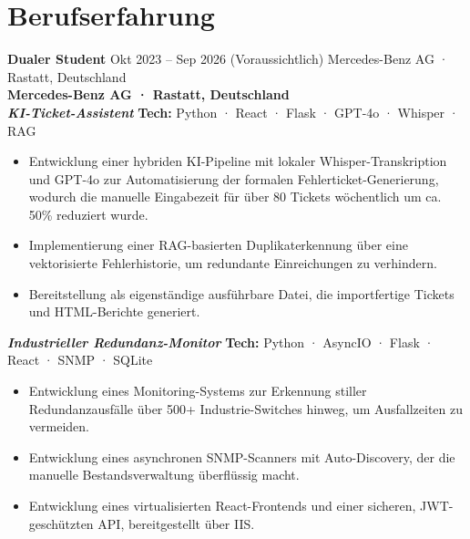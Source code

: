 \documentclass[10pt, a4paper]{article}
\newcommand{\entry}[3]{%
  \textbf{\large #1} \hfill \textcolor{subtle}{\small #2}%
  \def\temp{#3}\ifx\temp\empty\else\\[0.1em]\textbf{#3}\fi
}
\newcommand{\project}[2]{%
  \textbf{\textit{#1}} \hfill \textcolor{subtle}{\footnotesize \textbf{Tech:} #2}\vspace{0.1em}
}
\begin{document}
\begin{minipage}[t]{0.64\linewidth}


\section{Berufserfahrung}

\entry{Dualer Student}{Okt 2023 – Sep 2026 (Voraussichtlich)}{Mercedes-Benz AG · Rastatt, Deutschland}\\[0.2em]
\project{KI-Ticket-Assistent}{Python · React · Flask · GPT-4o · Whisper · RAG}
\begin{itemize}
  \item Entwicklung einer hybriden KI-Pipeline mit lokaler Whisper-Transkription und GPT-4o zur Automatisierung der formalen Fehlerticket-Generierung, wodurch die manuelle Eingabezeit für über 80 Tickets wöchentlich um ca. 50\% reduziert wurde.
  \item Implementierung einer RAG-basierten Duplikaterkennung über eine vektorisierte Fehlerhistorie, um redundante Einreichungen zu verhindern.
  \item Bereitstellung als eigenständige ausführbare Datei, die importfertige Tickets und HTML-Berichte generiert.
\end{itemize}

\vspace{0.4em}

\project{Industrieller Redundanz-Monitor}{Python · AsyncIO · Flask · React · SNMP · SQLite}
\begin{itemize}
  \item Entwicklung eines Monitoring-Systems zur Erkennung stiller Redundanzausfälle über 500+ Industrie-Switches hinweg, um Ausfallzeiten zu vermeiden.
  \item Entwicklung eines asynchronen SNMP-Scanners mit Auto-Discovery, der die manuelle Bestandsverwaltung überflüssig macht.
  \item Entwicklung eines virtualisierten React-Frontends und einer sicheren, JWT-geschützten API, bereitgestellt über IIS.
\end{itemize}

\vspace{0.4em}


\end{minipage}
\end{document}
